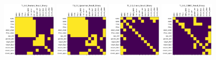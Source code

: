 \begin{figure}
    \includegraphics[width=0.24\textwidth]{diss/7_cond/figs/T1_0.0_Pearson_Result_Binary.png}
    \includegraphics[width=0.24\textwidth]{diss/7_cond/figs/T1_0.0_Spearman_Result_Binary.png}
    \includegraphics[width=0.24\textwidth]{diss/7_cond/figs/T1_0.0_Glasso_Result_Binary.png}
    \includegraphics[width=0.24\textwidth]{diss/7_cond/figs/T1_0.0_CODEC_Result_Binary.png}
    

\end{figure}
